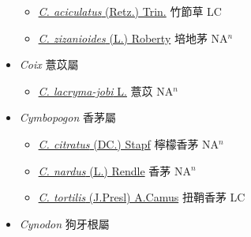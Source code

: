 \begin{itemize}
  \begin{itemize}
        \item[] \href{http://www.theplantlist.org/tpl1.1/search?q=Chrysopogon+aciculatus}{\textit{C. aciculatus} (Retz.) Trin.}   竹節草 LC
        \item[] \href{http://www.theplantlist.org/tpl1.1/search?q=Chrysopogon+zizanioides}{\textit{C. zizanioides} (L.) Roberty}     培地茅 NA$^n$
  \end{itemize}
 \item[] \textit{Coix} 薏苡屬
                    
  \begin{itemize}
        \item[] \href{http://www.theplantlist.org/tpl1.1/search?q=Coix+lacryma-jobi}{\textit{C. lacryma-jobi} L.}   薏苡 NA$^n$
  \end{itemize}
 \item[] \textit{Cymbopogon} 香茅屬
                    
  \begin{itemize}
        \item[] \href{http://www.theplantlist.org/tpl1.1/search?q=Cymbopogon+citratus}{\textit{C. citratus} (DC.) Stapf}   檸檬香茅 NA$^n$
        \item[] \href{http://www.theplantlist.org/tpl1.1/search?q=Cymbopogon+nardus}{\textit{C. nardus} (L.) Rendle}   香茅 NA$^n$
        \item[] \href{http://www.theplantlist.org/tpl1.1/search?q=Cymbopogon+tortilis}{\textit{C. tortilis} (J.Presl) A.Camus}   扭鞘香茅 LC
  \end{itemize}
 \item[] \textit{Cynodon} 狗牙根屬
                    

\end{itemize}
